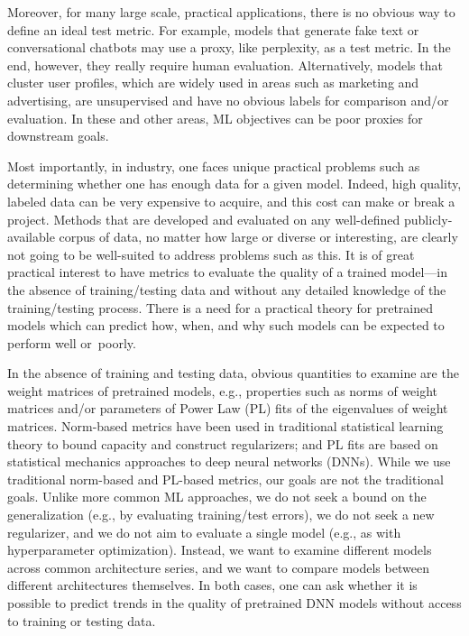 \documentclass{article}
\begin{document}
Moreover, for many large scale, practical applications, there is no obvious way to define an ideal test metric. 
For example, models that generate fake text or conversational chatbots may use a proxy, like perplexity, as a test metric.
In the end, however, they really require human evaluation. 
Alternatively, models that cluster user profiles, which are widely used in areas such as marketing and advertising, are unsupervised and have no obvious labels for comparison and/or evaluation.
In these and other areas, ML objectives can be poor proxies for downstream goals.

Most importantly, in industry, one faces unique practical problems such as determining whether one has enough data for a given model. 
Indeed, high quality, labeled data can be very expensive to acquire, and this cost can make or break a project.
Methods that are developed and evaluated on any well-defined publicly-available corpus of data, no matter how large or diverse or interesting, are clearly not going to be well-suited to address problems such as this.
It is of great practical interest to have metrics to evaluate the quality of a trained model---in the absence of training/testing data and without any detailed knowledge of the training/testing process.  
There is a need for a practical theory for pretrained models which can predict how, when, and why such models can be expected to perform well or~poorly.

In the absence of training and testing data, obvious quantities to examine are the weight matrices of pretrained models, e.g., 
properties such as norms of weight matrices and/or parameters of Power Law (PL) fits of the eigenvalues of weight matrices.
Norm-based metrics have been used in traditional statistical learning theory to bound capacity and construct regularizers; and PL fits are based on statistical mechanics approaches to deep neural networks (DNNs).
While we use traditional norm-based and PL-based metrics, our goals are not the traditional goals.
Unlike more common ML approaches, we do not seek a bound on the generalization (e.g., by evaluating training/test errors), we do not seek a new regularizer, and we do not aim to evaluate a single model (e.g., as with hyperparameter optimization).
Instead, we want to examine different models across common architecture series, and we want to compare models between different architectures themselves.
In both cases, one can ask whether it is possible to predict trends in the quality of pretrained DNN models without access to training or testing data.  
\end{document}
